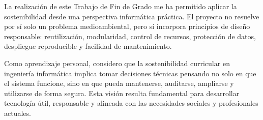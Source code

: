 La realización de este Trabajo de Fin de Grado me ha permitido aplicar la sostenibilidad desde una perspectiva informática práctica. El proyecto no resuelve por sí solo un problema medioambiental, pero sí incorpora principios de diseño responsable: reutilización, modularidad, control de recursos, protección de datos, despliegue reproducible y facilidad de mantenimiento.

Como aprendizaje personal, considero que la sostenibilidad curricular en ingeniería informática implica tomar decisiones técnicas pensando no solo en que el sistema funcione, sino en que pueda mantenerse, auditarse, ampliarse y utilizarse de forma segura. Esta visión resulta fundamental para desarrollar tecnología útil, responsable y alineada con las necesidades sociales y profesionales actuales.